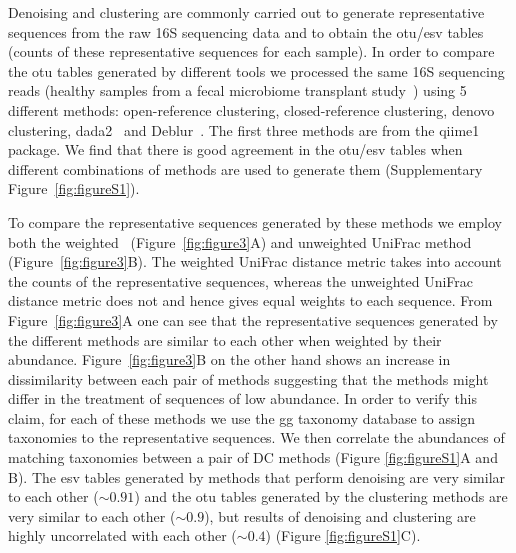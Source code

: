   Denoising and clustering are commonly carried out to generate representative sequences from the raw 16S sequencing data and to obtain the \ac{otu}/\ac{esv} tables (counts of these representative sequences for each sample).
  In order to compare the \ac{otu} tables generated by different tools we processed the same 16S sequencing reads (healthy samples from a fecal microbiome transplant study~\cite{Kang2017}) using 5 different methods:  open-reference clustering, closed-reference clustering, denovo clustering, \ac{dada2}~\cite{Callahan2016} and Deblur~\cite{Amir2017}.
  The first three methods are from the \ac{qiime1}~\cite{Caporaso2010} package.
  We find that there is good agreement in the \ac{otu}/\ac{esv} tables when different combinations of methods are used to generate them (Supplementary Figure~\ref{fig:figureS1}).

  To compare the representative sequences generated by these methods we employ both the weighted~\cite{Lozupone2007} (Figure~\ref{fig:figure3}A) and unweighted UniFrac method~\cite{Lozupone2005} (Figure~\ref{fig:figure3}B).
  The weighted UniFrac distance metric takes into account the counts of the representative sequences, whereas the unweighted UniFrac distance metric does not and hence gives equal weights to each sequence.
  From Figure~\ref{fig:figure3}A one can see that the representative sequences generated by the different methods are similar to each other when weighted by their abundance.
  Figure~\ref{fig:figure3}B on the other hand shows an increase in dissimilarity between each pair of methods suggesting that the methods might differ in the treatment of sequences of low abundance.
  In order to verify this claim, for each of these methods we use the \ac{gg} taxonomy database to assign taxonomies to the representative sequences.
  We then correlate the abundances of matching taxonomies between a pair of DC methods (Figure \ref{fig:figureS1}A and B).
  The \ac{esv} tables generated by methods that perform denoising are very similar to each other ($\sim0.91$) and the \ac{otu} tables generated by the clustering methods are very similar to each other ($\sim0.9$), but results of denoising and clustering are highly uncorrelated with each other ($\sim0.4$) (Figure \ref{fig:figureS1}C).

